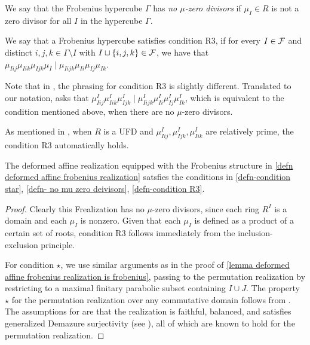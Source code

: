 \begin{defn}\cite[Definition 1.8]{EWSFrob} \label{defn- no mu zero deivisors} We say that the Frobenius hypercube $\Gamma$ has \emph{no $\mu$-zero
    divisors} if $\mu_I \in R$ is not a zero divisor for all $I$ in the hypercube $\Gamma$.
\end{defn}



\begin{defn}\cite[Definition 1.10]{EWSFrob}\label{defn-condition R3} We say that a Frobenius hypercube satisfies condition R3, if for every $I \in \mathcal{F}$ and distinct  $i, j, k \in \Gamma \setminus I$ with $I \sqcup\{i,j,k\} \in \mathcal{F}$, we have that ${\mu_{Iij} \mu_{Iik} 
\mu_{Ijk} \mu_I} \mid {\mu_{Iijk} \mu_{Ii} \mu_{Ij}\mu_{Ik}}$.
\end{defn}

\begin{remark}
Note that in \cite{EWSFrob}, the phrasing for condition R3 is slightly different. Translated to our notation, \cite[Definition 1.10]{EWSFrob} asks that
${\mu^I_{Iij} \mu^I_{Iik} 
\mu^I_{Ijk}} \mid {\mu^I_{Iijk} \mu^I_{Ii} \mu^I_{Ij}\mu^I_{Ik}}$,
which is equivalent to the condition mentioned above, when there are no $\mu$-zero divisors.

As mentioned in \cite[Remark 1.11]{EWSFrob}, when $R$ is a UFD and 
 $\mu^I_{Iij}, \mu^I_{Ijk}, \mu^I_{Iik}$
 are relatively prime, the condition R3 automatically holds. 
\end{remark}

\begin{lemma}\label{lemma deformed affine frobenius satisfies extra conditions}
   The deformed affine realization equipped with the Frobenius structure in \cref{defn deformed affine frobenius realization} satsfies the conditions in 
   \cref{defn-condition star}, \cref{defn- no mu zero deivisors}, \cref{defn-condition R3}.
\end{lemma}

\begin{proof} Clearly this Frealization has no $\mu$-zero divisors, since each ring $R^I$ is a domain and each $\mu_I$ is nonzero. Given that each $\mu_I$ is defined as a product of a certain set of roots, condition R3 follows immediately from the inclusion-exclusion principle.

For condition $\star$, we use similar arguments as in the proof of \cref{lemma deformed affine frobenius realization is frobenius}, passing to the permutation realization by restricting to a maximal finitary parabolic subset containing $I \cup J$. The property $\star$ for the permutation realization over any commutative domain follows from \cite[Theorem 4.15, Example 4.17]{EKLP}. The assumptions for \cite[Theorem 4.15]{EKLP} are that the realization is faithful, balanced, and satisfies generalized Demazure surjectivity (see \cite[Section 3.1]{EKLP}), all of which are known to hold for the permutation realization.

\end{proof}


